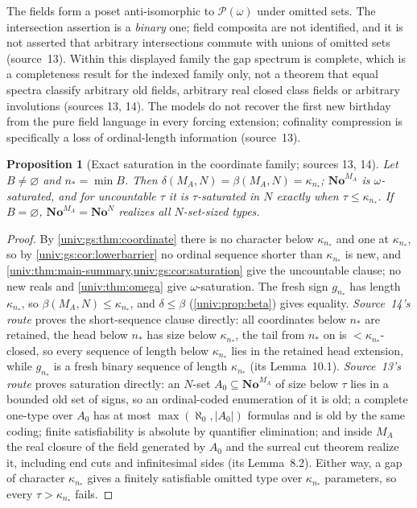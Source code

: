 \documentclass[11pt,letterpaper]{article}
\numberwithin{equation}{section}
\newtheorem{proposition}[proposition]{Proposition}
\theoremstyle{definition}
\theoremstyle{remark}
\newcommand{\No}{\mathbf{No}}
\newcommand{\Pow}{\mathcal P}
\newcommand{\abs}[1]{\lvert#1\rvert}
\begin{document}
The fields form a poset anti-isomorphic to $\Pow(\omega)$ under omitted sets. The
intersection assertion is a \emph{binary} one; field composita are not identified, and it
is not asserted that arbitrary intersections commute with unions of omitted sets
(source~13). Within this displayed family the gap spectrum is complete, which is a
completeness result for the indexed family only, not a theorem that equal spectra
classify arbitrary old fields, arbitrary real closed class fields or arbitrary
involutions (sources 13, 14). The models do not recover the first new birthday from the
pure field language in every forcing extension; cofinality compression is specifically a
loss of ordinal-length information (source~13).

\begin{proposition}[Exact saturation in the coordinate family; sources 13, 14]\label{univ:gs:prop:threshold}
Let $B\ne\varnothing$ and $n_*=\min B$. Then
$\delta(M_A,N)=\beta(M_A,N)=\kappa_{n_*}$; $\No^{M_A}$ is
$\omega$-saturated, and for uncountable $\tau$ it is $\tau$-saturated in $N$ exactly when
$\tau\le\kappa_{n_*}$. If $B=\varnothing$, $\No^{M_A}=\No^N$ realizes all $N$-set-sized types.
\end{proposition}
\begin{proof}
By \cref{univ:gs:thm:coordinate} there is no character below $\kappa_{n_*}$ and one at
$\kappa_{n_*}$, so by \cref{univ:gs:cor:lowerbarrier} no ordinal sequence shorter than
$\kappa_{n_*}$ is new, and \cref{univ:thm:main-summary,univ:gs:cor:saturation} give the
uncountable clause; no new reals and \cref{univ:thm:omega} give $\omega$-saturation.
The fresh sign $g_{n_*}$ has length $\kappa_{n_*}$, so $\beta(M_A,N)\le\kappa_{n_*}$, and
$\delta\le\beta$ (\cref{univ:prop:beta}) gives equality. \emph{Source~14's route} proves the short-sequence clause directly: all coordinates below
$n_*$ are retained, the head below $n_*$ has size below $\kappa_{n_*}$, the tail from
$n_*$ on is $<\kappa_{n_*}$-closed, so every sequence of length below $\kappa_{n_*}$ lies
in the retained head extension, while $g_{n_*}$ is a fresh binary sequence of length
$\kappa_{n_*}$ (its Lemma~10.1). \emph{Source~13's route} proves saturation directly: an
$N$-set $A_0\subseteq\No^{M_A}$ of size below $\tau$ lies in a bounded old set of signs,
so an ordinal-coded enumeration of it is old; a complete one-type over $A_0$ has at most
$\max(\aleph_0,\abs{A_0})$ formulas and is old by the same coding; finite satisfiability
is absolute by quantifier elimination; and inside $M_A$ the real closure of the field
generated by $A_0$ and the surreal cut theorem realize it, including end cuts and
infinitesimal sides (its Lemma~8.2). Either way, a gap of character $\kappa_{n_*}$ gives a
finitely satisfiable omitted type over $\kappa_{n_*}$ parameters, so every
$\tau>\kappa_{n_*}$ fails.
\end{proof}
\end{document}
